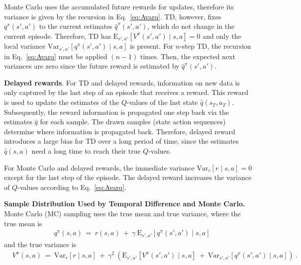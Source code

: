 \documentclass{article}
\newcommand\EXP{\mathbf{\mathrm{E}}}
\newcommand\VAR{\mathbf{\mathrm{Var}}}
\begin{document}
\begin{appendices}
Monte Carlo uses the accumulated future rewards for updates, therefore
its variance is given by the recursion in Eq.~\eqref{eq:Avarq}.
TD, however, fixes $q^\pi(s', a')$ to the current
estimates $\hat{q}^\pi(s', a')$, which do not change in the current
episode. 
Therefore, TD has $\EXP_{s',a'} \left[V^{\pi}(s',a') \mid s,a\right]=0$ and
only the local variance
$\VAR_{s',a'} \left[q^\pi(s', a') \mid s,a\right]$
is present.
For $n$-step TD, the recursion in Eq.~\eqref{eq:Avarq} must be applied
$(n-1)$ times. Then, the expected next variances are zero since
the future reward is estimated by $\hat{q}^\pi(s', a')$.

{\bf Delayed rewards}.
For TD and delayed rewards, information on new data is only captured by the
last step of an episode that receives a reward. This reward is used
to update the estimates of the $Q$-values of the
last state $\hat{q}(s_T,a_T)$.
Subsequently, the reward information is propagated
one step back via the estimates $\hat{q}$ for each sample.
The drawn samples (state action sequences)
determine where information is propagated back.
Therefore, delayed reward introduces a large bias for TD over a long
period of time,
since the estimates $\hat{q}(s,a)$ need a long time to reach their true $Q$-values.

For Monte Carlo and delayed rewards,
the immediate variance $\VAR_r \left[ r \mid s,a \right]=0$ except for the
last step of the episode. 
The delayed reward
increases the variance of $Q$-values according to Eq.~\eqref{eq:Avarq}.




{\bf Sample Distribution Used by Temporal Difference and
  Monte Carlo.}
  \label{sec:ASDTDMC}
Monte Carlo (MC) sampling uses the true mean and true variance, where the true mean is
\begin{align}
  &q^\pi(s,a) \ = \  
  r(s,a) \ + \ \gamma \
  \EXP_{s',a'} \left[q^\pi(s', a') \mid s,a\right] 
\end{align}
and the true variance is
\begin{align}
  &V^{\pi}(s,a) \ = \ \VAR_r \left[ r \mid s,a \right] \ + \ \gamma^2  \  \left(
    \EXP_{s',a'}  \left[V^{\pi}(s',a') \mid s,a\right]
  \ + \   \VAR_{s',a'} \left[q^\pi(s', a') \mid s,a\right]  \right)
  \ .  
\end{align}


\end{appendices}
\end{document}
